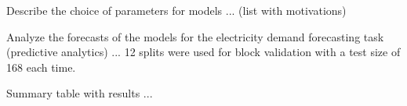 Describe the choice of parameters for models ... (list with motivations)

Analyze the forecasts of the models for the electricity demand forecasting task (predictive analytics) ...
12 splits were used for block validation with a test size of 168 each time. %

Summary table with results ...
